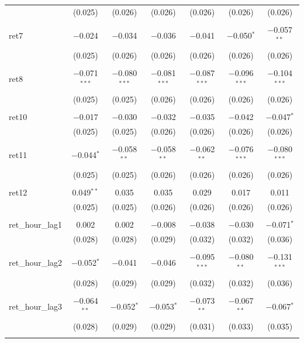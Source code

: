 \begin{table}[!htbp]
\begin{tabular}{@{\extracolsep{5pt}}lcccccc}
  & (0.025) & (0.026) & (0.026) & (0.026) & (0.026) & (0.026) \\ 
  & & & & & & \\ 
 ret7 & $-$0.024 & $-$0.034 & $-$0.036 & $-$0.041 & $-$0.050$^{*}$ & $-$0.057$^{**}$ \\ 
  & (0.025) & (0.026) & (0.026) & (0.026) & (0.026) & (0.026) \\ 
  & & & & & & \\ 
 ret8 & $-$0.071$^{***}$ & $-$0.080$^{***}$ & $-$0.081$^{***}$ & $-$0.087$^{***}$ & $-$0.096$^{***}$ & $-$0.104$^{***}$ \\ 
  & (0.025) & (0.025) & (0.026) & (0.026) & (0.026) & (0.026) \\ 
  & & & & & & \\ 
 ret10 & $-$0.017 & $-$0.030 & $-$0.032 & $-$0.035 & $-$0.042 & $-$0.047$^{*}$ \\ 
  & (0.025) & (0.025) & (0.026) & (0.026) & (0.026) & (0.026) \\ 
  & & & & & & \\ 
 ret11 & $-$0.044$^{*}$ & $-$0.058$^{**}$ & $-$0.058$^{**}$ & $-$0.062$^{**}$ & $-$0.076$^{***}$ & $-$0.080$^{***}$ \\ 
  & (0.025) & (0.025) & (0.026) & (0.026) & (0.026) & (0.026) \\ 
  & & & & & & \\ 
 ret12 & 0.049$^{**}$ & 0.035 & 0.035 & 0.029 & 0.017 & 0.011 \\ 
  & (0.025) & (0.025) & (0.026) & (0.026) & (0.026) & (0.026) \\ 
  & & & & & & \\ 
 ret\_hour\_lag1 & 0.002 & 0.002 & $-$0.008 & $-$0.038 & $-$0.030 & $-$0.071$^{*}$ \\ 
  & (0.028) & (0.028) & (0.029) & (0.032) & (0.032) & (0.036) \\ 
  & & & & & & \\ 
 ret\_hour\_lag2 & $-$0.052$^{*}$ & $-$0.041 & $-$0.046 & $-$0.095$^{***}$ & $-$0.080$^{**}$ & $-$0.131$^{***}$ \\ 
  & (0.028) & (0.029) & (0.029) & (0.032) & (0.032) & (0.036) \\ 
  & & & & & & \\ 
 ret\_hour\_lag3 & $-$0.064$^{**}$ & $-$0.052$^{*}$ & $-$0.053$^{*}$ & $-$0.073$^{**}$ & $-$0.067$^{**}$ & $-$0.067$^{*}$ \\ 
  & (0.028) & (0.029) & (0.029) & (0.031) & (0.033) & (0.035) \\ 
  & & & & & & \\ 

\end{tabular}
\end{table}
